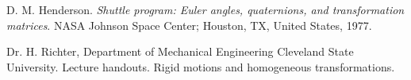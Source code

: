 \documentclass[14pt]{extarticle}
\begin{document}
\begin{thebibliography}{1}
D. M. Henderson. \textit{Shuttle program: Euler angles, quaternions, and transformation matrices}.	NASA Johnson Space Center; Houston, TX, United States, 1977.

Dr. H. Richter, Department of Mechanical Engineering Cleveland State University. Lecture handouts. Rigid motions and homogeneous transformations.
\end{thebibliography}
\end{document}
